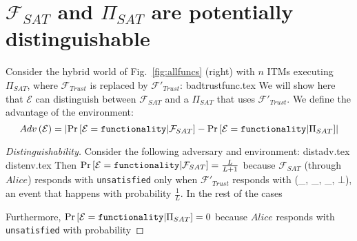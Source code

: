 \section{$\mathcal{F}_{SAT}$ and $\Pi_{SAT}$ are potentially distinguishable}
  Consider the hybrid world of Fig.~\ref{fig:allfuncs} (right) with $n$ ITMs executing
  $\Pi_{SAT}$, where $\mathcal{F}_{Trust}$ is replaced by $\mathcal{F}'_{Trust}$:
  {badtrustfunc.tex}
  We will show here that $\mathcal{E}$ can distinguish between $\mathcal{F}_{SAT}$ and a
  $\Pi_{SAT}$ that uses $\mathcal{F}'_{Trust}$. We define the advantage of the
  environment:
  \begin{equation*}
    Adv\left(\mathcal{E}\right) = \left|\Pr\left[\mathcal{E} =
    \mbox{\texttt{functionality}} | \mathcal{F}_{SAT}\right] - \Pr\left[\mathcal{E} =
    \mbox{\texttt{functionality}} | \Pi_{SAT}\right]\right|
  \end{equation*}

  \begin{proof}[Distinguishability]
    Consider the following adversary and environment:
    {distadv.tex}
    {distenv.tex}
    Then $\Pr\left[\mathcal{E} = \mbox{\texttt{functionality}} | \mathcal{F}_{SAT}\right]
    = \frac{L}{L + 1}$ because $\mathcal{F}_{SAT}$ (through $Alice$) responds with
    \texttt{unsatisfied} only when $\mathcal{F}'_{Trust}$ responds with (\_, \_, \_,
    $\bot$), an event that happens with probability $\frac{1}{L}$. In the rest of the
    cases

    Furthermore, $\Pr\left[\mathcal{E} = \mbox{\texttt{functionality}} | \Pi_{SAT}\right]
    = 0$ because $Alice$ responds with \texttt{unsatisfied} with probability
  \end{proof}
